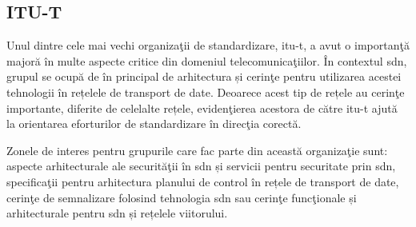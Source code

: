 \subsection{ITU-T}

Unul dintre cele mai vechi organizaţii de standardizare, \gls{itu-t}, a avut o importanţă majoră în multe aspecte critice din domeniul telecomunicaţiilor. În contextul \gls{sdn}, grupul se ocupă de în principal de arhitectura și cerinţe pentru utilizarea acestei tehnologii în rețelele de transport de date. Deoarece acest tip de rețele au cerinţe importante, diferite de celelalte rețele, evidenţierea acestora de către \gls{itu-t} ajută la orientarea eforturilor de standardizare în direcţia corectă. 

Zonele de interes pentru grupurile care fac parte din această organizaţie sunt: aspecte arhitecturale ale securităţii în \gls{sdn} și servicii pentru securitate prin \gls{sdn}, specificaţii pentru arhitectura planului de control în rețele de transport de date, cerinţe de semnalizare folosind tehnologia \gls{sdn} sau cerinţe funcţionale și arhitecturale pentru \gls{sdn} și rețelele viitorului.

